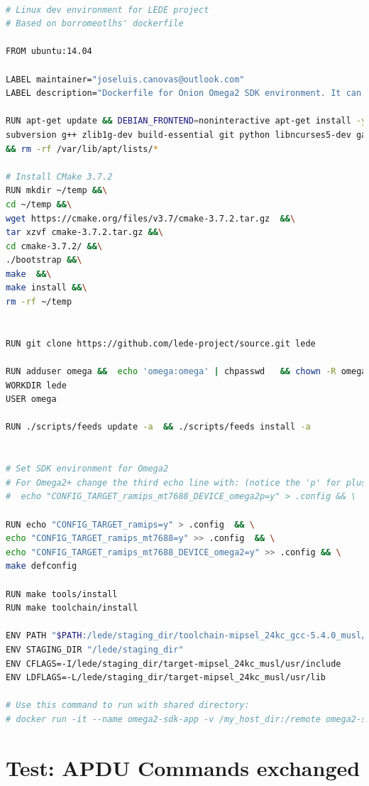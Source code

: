 \begin{lstlisting}[language=bash,frame=tb,caption={Dockerfile for Omega2 SDK},label=lst:dockerLEDE]

# Linux dev environment for LEDE project
# Based on borromeotlhs' dockerfile

FROM ubuntu:14.04

LABEL maintainer="joseluis.canovas@outlook.com"
LABEL description="Dockerfile for Onion Omega2 SDK environment. It can be modified for Omega2+."

RUN apt-get update && DEBIAN_FRONTEND=noninteractive apt-get install -y \
subversion g++ zlib1g-dev build-essential git python libncurses5-dev gawk gettext unzip file libssl-dev wget \
&& rm -rf /var/lib/apt/lists/*

# Install CMake 3.7.2
RUN mkdir ~/temp &&\
cd ~/temp &&\
wget https://cmake.org/files/v3.7/cmake-3.7.2.tar.gz  &&\
tar xzvf cmake-3.7.2.tar.gz &&\
cd cmake-3.7.2/ &&\
./bootstrap &&\
make  &&\
make install &&\
rm -rf ~/temp


RUN git clone https://github.com/lede-project/source.git lede

RUN adduser omega &&  echo 'omega:omega' | chpasswd   && chown -R omega:omega lede
WORKDIR lede
USER omega

RUN ./scripts/feeds update -a  && ./scripts/feeds install -a 


# Set SDK environment for Omega2
# For Omega2+ change the third echo line with: (notice the 'p' for plus)
#  echo "CONFIG_TARGET_ramips_mt7688_DEVICE_omega2p=y" > .config && \

RUN echo "CONFIG_TARGET_ramips=y" > .config  && \
echo "CONFIG_TARGET_ramips_mt7688=y" >> .config  && \
echo "CONFIG_TARGET_ramips_mt7688_DEVICE_omega2=y" >> .config && \
make defconfig

RUN make tools/install
RUN make toolchain/install

ENV PATH "$PATH:/lede/staging_dir/toolchain-mipsel_24kc_gcc-5.4.0_musl/bin"
ENV STAGING_DIR "/lede/staging_dir"
ENV CFLAGS=-I/lede/staging_dir/target-mipsel_24kc_musl/usr/include
ENV LDFLAGS=-L/lede/staging_dir/target-mipsel_24kc_musl/usr/lib

# Use this command to run with shared directory:
# docker run -it --name omega2-sdk-app -v /my_host_dir:/remote omega2-sdk bash

\end{lstlisting}

\chapter{Test: APDU Commands exchanged}\label{ch:resultsdiagrams}

